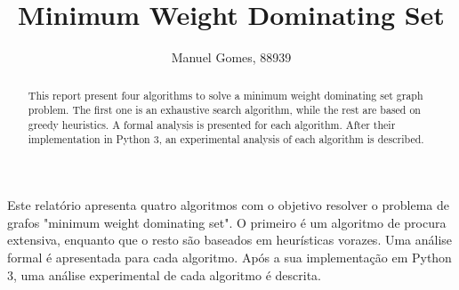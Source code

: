 \documentclass[shortpaper,english,final]{revdetua}
\begin{document}

\title{Minimum Weight Dominating Set}
\author{Manuel Gomes, 88939} %
\maketitle

\begin{abstract}%
This report present four algorithms to solve a minimum weight dominating set graph problem.
The first one is an exhaustive search algorithm, while the rest are based on greedy heuristics.
A formal analysis is presented for each algorithm.
After their implementation in Python 3, an experimental analysis of each algorithm is described.
\end{abstract}

\begin{resumo}%
Este relatório apresenta quatro algoritmos com o objetivo resolver o problema de grafos "minimum weight dominating set".
O primeiro é um algoritmo de procura extensiva, enquanto que o resto são baseados em heurísticas vorazes.
Uma análise formal é apresentada para cada algoritmo.
Após a sua implementação em Python 3, uma análise experimental de cada algoritmo é descrita.
\end{resumo}











\end{document}

